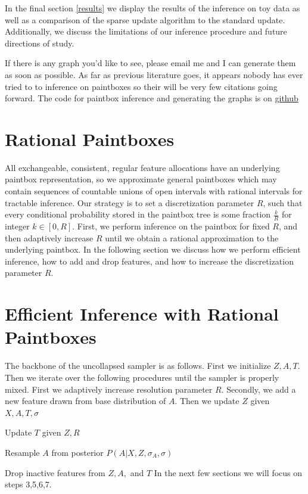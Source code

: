\documentclass{article}
\begin{document}
In the final section \ref{results} we display the results of the inference on toy data as well as a comparison of the sparse update algorithm to the standard update.  Additionally, we discuss the limitations of our inference procedure and future directions of study.  

If there is any graph you'd like to see, please email me and I can generate them as soon as possible.  As far as previous literature goes, it appears nobody has ever tried to to inference on paintboxes so their will be very few citations going forward.  The code for paintbox inference and generating the graphs is on \href{https://github.com/muherng/cs282/tree/master/code/cs282np-public-master/final}{github}  

\section{Rational Paintboxes} 
All exchangeable, consistent, regular feature allocations have an underlying paintbox representation, so we approximate general paintboxes which may contain sequences of countable unions of open intervals with rational intervals for tractable inference.  Our strategy is to set a discretization parameter $R$, such that every conditional probability stored in the paintbox tree is some fraction $\frac{k}{R}$ for integer $k \in [0,R]$.  First, we perform inference on the paintbox for fixed $R$, and then adaptively increase $R$ until we obtain a rational approximation to the underlying paintbox.  In the following section we discuss how we perform efficient inference, how to add and drop features, and how to increase the discretization parameter $R$.       

\section{Efficient Inference with Rational Paintboxes} 
\label{implementation}


The backbone of the uncollapsed sampler is as follows.   
First we initialize $Z,A,T$. Then we iterate over the following procedures until the sampler is properly mixed.  First we adaptively increase resolution parameter $R$.  Secondly, we add a new feature drawn from base distribution of $A$.  Then we update $Z$ given $X,A,T,\sigma$
\item Update $T$ given $Z,R$
\item Resample $A$ from posterior $P(A|X,Z,\sigma_A,\sigma)$
\item Drop inactive features from $Z,A,$ and $T$
In the next few sections we will focus on steps 3,5,6,7.  
\end{document}
